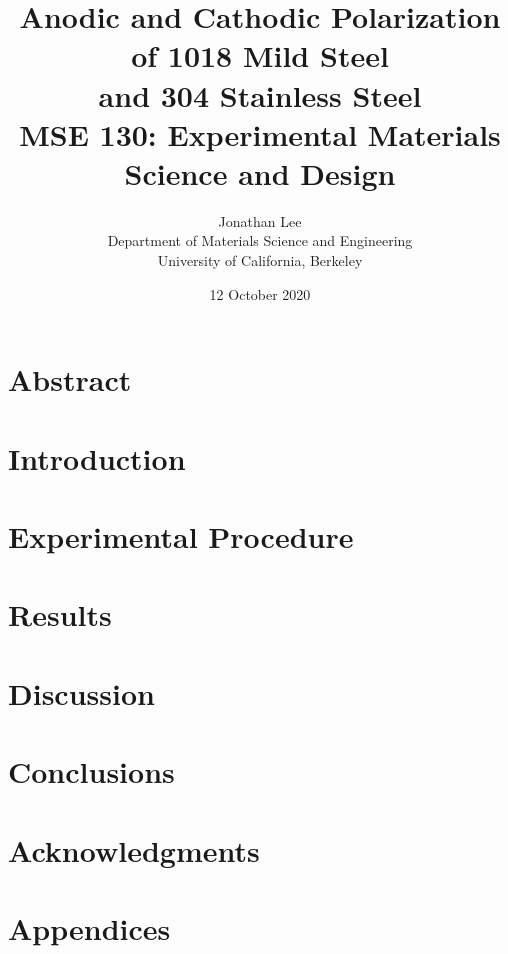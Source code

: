 \documentclass[12pt, titlepage]{article}
\title{\Large Anodic and Cathodic Polarization of 1018 Mild Steel \\
		and 304 Stainless Steel \\
		\bigskip
	\normalsize MSE 130: Experimental Materials Science and Design}
\author{\normalsize Jonathan Lee \\
	\normalsize Department of Materials Science and Engineering \\
	\normalsize University of California, Berkeley}
\date{\normalsize 12 October 2020}
\begin{document}
\maketitle

\doublespacing

\setcounter{page}{2}

\tableofcontents

\newpage

\section{Abstract}

\section{Introduction}

% 

\section{Experimental Procedure}

% 

\begin{table}[h!]
	\centering
	
\end{table}

\section{Results}



\section{Discussion}



\section{Conclusions}

\section{Acknowledgments}


\section{Appendices}
\end{document}
